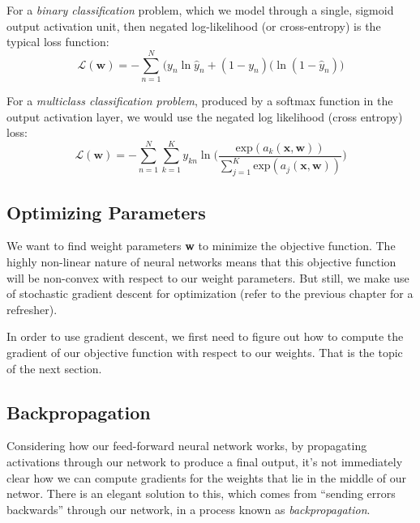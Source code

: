       For a {\em binary classification} problem, which we model through a single, sigmoid output activation unit,
     then  negated log-likelihood (or cross-entropy) is the typical  loss function:
\begin{equation} \label{cross-entropy-loss-function}
	\mathcal{L}(\textbf{w}) = - \sum_{n=1}^{N} \bigg(y_{n}\ln{\hat{y}_{n}} + (1 - y_{n})(\ln{(1 - \hat{y}_{n})}\bigg)
      \end{equation}
      
      For a {\em multiclass classification problem}, produced by a softmax function in the output activation layer, we
      would use the negated log likelihood (cross entropy) loss:
\begin{equation} \label{multiclass-cross-entropy-loss-function}
	\mathcal{L}(\textbf{w}) = - \sum_{n=1}^{N} \sum_{k=1}^{K} y_{kn} \ln{\bigg(\frac{\text{exp}(a_{k}(\textbf{x}, \textbf{w}))}{\sum_{j=1}^{K}\text{exp}(a_{j}(\textbf{x}, \textbf{w}))}\bigg)}
\end{equation}


\subsection{Optimizing Parameters}

We want to find weight parameters \textbf{w} to minimize the objective function. The highly non-linear nature of neural networks means that this objective function will be non-convex with respect to our weight parameters. But still, we make use of stochastic gradient descent for optimization (refer to the previous chapter for a refresher).

In order to use gradient descent, we first need to figure out how to compute the gradient of our objective function with respect to our weights. That is the topic of the next section.

\subsection{Backpropagation}

Considering how our feed-forward neural network works, by propagating activations through our network to produce a final output, it's not immediately clear how we can compute gradients for the weights that lie in the middle of our networ. There is an elegant solution to this, which comes from ``sending errors backwards'' through our network, in a process known as \textit{backpropagation}.

